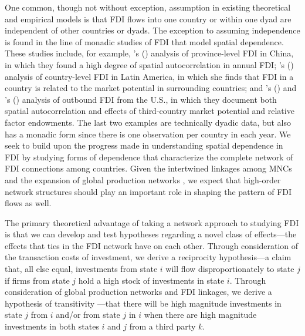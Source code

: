\documentclass[reqno,onecolumn,letterpaper,12pt]{article}
\newcommand\citeapos[1]{\citeauthor{#1}'s (\citeyear{#1})}
\begin{document}
One common, though not without exception, assumption in existing theoretical and empirical models is that FDI flows into one country or within one dyad are independent of other countries or dyads.  The exception to assuming independence is found in the line of monadic studies of FDI that model spatial dependence. These studies include, for example, \citeapos{coughlin2000foreign} analysis of province-level FDI in China, in which they found a high degree of spatial autocorrelation in annual FDI; \citeapos{blanco2012spatial} analysis of country-level FDI in Latin America, in which she finds that FDI in a country is related to the market potential in surrounding countries; and \citeapos{Baltagi_et_al:2007} and \citeapos{blonigen2007fdi} analysis of outbound FDI from the U.S., in which they document both spatial autocorrelation and effects of third-country market potential and relative factor endowments. The last two examples \citep[i.e.,][]{blonigen2007fdi} are technically dyadic data, but also has a monadic form since there is one observation per country in each year. %
We seek to build upon the progress made in understanding spatial dependence in FDI by studying forms of dependence that characterize the complete network of FDI connections among countries. Given the intertwined linkages among MNCs and the expansion of global production networks \citep{UNCTAD:2013,Baldwin:2011}, we expect that high-order network structures should play an important role in shaping the pattern of FDI flows as well.


The primary theoretical advantage of taking a network approach to studying FDI is that we can develop and test hypotheses regarding a novel class of effects---the effects that ties in the FDI network have on each other. %
Through consideration of the %
transaction costs of investment, we derive a reciprocity %
hypothesis---a claim that, all else equal, investments from state $i$ will flow disproportionately to state $j$ if firms from state $j$ hold a high stock of investments in state $i$. Through consideration of global production networks and FDI linkages, we derive a hypothesis of transitivity%
---that there will be high magnitude investments in state $j$ from $i$  and/or from state $j$ in $i$ when there are high magnitude investments in both states $i$ and $j$ from a third party $k$.
\end{document}
